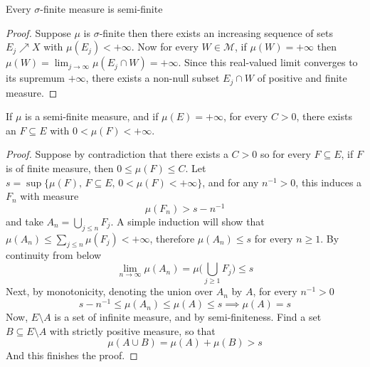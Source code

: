 \documentclass[../../main.tex]{subfiles}
\begin{document}
%
\begin{wts}
Every $\sigma$-finite measure is semi-finite
\end{wts}
\begin{proof}
    Suppose $\mu$ is $\sigma$-finite then there exists an increasing sequence of sets $E_j\nearrow X$ with $\mu(E_j)<+\infty$. Now for every $W\in\mathcal{M}$, if $\mu(W)=+\infty$ then $\mu(W)=\lim_{j\to\infty}\mu(E_j\cap W)=+\infty$. Since this real-valued limit converges to its supremum $+\infty$, there exists a non-null subset $E_j\cap W$ of positive and finite measure.
\end{proof}
\newpage



%
\begin{wts}
If $\mu$ is a semi-finite measure, and if $\mu(E)=+\infty$, for every $C>0$, there exists an $F\subseteq E$ with $0<\mu(F)<+\infty$.
\end{wts}
\begin{proof}
    Suppose by contradiction that there exists a $C>0$ so for every $F\subseteq E$, if $F$ is of finite measure, then $0\leq \mu(F)\leq C$. Let $s = \sup\{\mu(F),\,F\subseteq E,\, 0<\mu(F)<+\infty\}$, and for any $n^{-1}>0$, this induces a $F_n$ with measure
    \[
    \mu(F_n)>s-n^{-1}
    \] 
    and take $A_n = \bigcup_{j\leq n}F_j$. A simple induction will show that $\mu(A_n)\leq \sum_{j\leq n} \mu(F_j)<+\infty$, therefore $\mu(A_n)\leq s$ for every $n\geq 1$. By continuity from below
    \[
    \lim_{n\to\infty}\mu(A_n)=\mu\biggl(\bigcup_{j\geq 1}F_j\biggr)\leq s
    \]
    Next, by monotonicity, denoting the union over $A_n$ by $A$, for every $n^{-1}>0$
    \[
    s-n^{-1}\leq\mu(A_n)\leq\mu(A)\leq s\implies \mu(A)=s
    \]
    Now, $E\setminus A$ is a set of infinite measure, and by semi-finiteness. Find a set $B\subseteq E\setminus A$ with strictly positive measure, so that 
    \[
    \mu(A\cup B)=\mu(A)+\mu(B)>s
    \]
And this finishes the proof.
\end{proof}
\newpage
\end{document}
